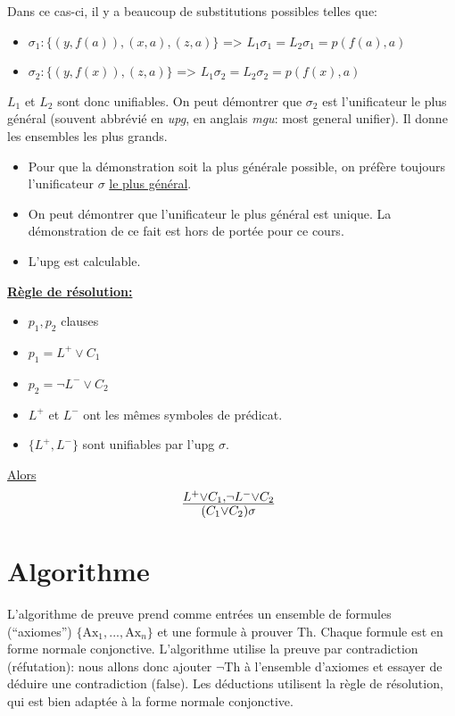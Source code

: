 {Dans ce cas-ci, il y a beaucoup de substitutions possibles telles que:
\begin{itemize}
  \item $\sigma_1 : \big\{ (y, f(a)), (x,a), (z,a) \big\}$ => $L_1 \sigma_1 = L_2 \sigma_1 = p(f(a), a)$
  \item $\sigma_2 : \big\{ (y, f(x)), (z,a) \big\}$ \hspace{11 mm}=> $L_1 \sigma_2 = L_2 \sigma_2 = p(f(x), a)$
\end{itemize}
$L_1$ et $L_2$ sont donc unifiables.
On peut démontrer que $\sigma_2$ est l'unificateur le plus général (souvent abbrévié en {\em upg},
en anglais {\em mgu}: most general unifier).
Il donne les ensembles les plus grands.\\

\begin{itemize}
  \item Pour que la démonstration soit la plus générale possible,
  on préfère toujours l'unificateur $\sigma$ \underline{le plus général}.
  \item On peut démontrer que l'unificateur le plus général est unique.
  La démonstration de ce fait est hors de portée pour ce cours.
  \item L'upg est calculable.
\end{itemize}

\vspace{5 mm}
\textbf{\underline{Règle de résolution:}}
\begin{itemize}
  \item $p_1, p_2$ clauses
  \item $p_1 = L^{+} \vee C_1$
  \item $p_2 = \neg L^{-} \vee C_2$
  \item $ L^{+}$ et $L^{-}$ ont les mêmes symboles de prédicat.
  \item $ \big\{L^{+}, L^{-}\big\}$ sont unifiables par l'upg $\sigma$.
\end{itemize}

\underline{Alors} $$ \mbox{\Large $\frac{L^{+} \vee C_1, \neg L^{-} \vee C_2}{(C_1 \vee C_2)\sigma}$ } $$

\section{Algorithme}

L'algorithme de preuve prend comme entrées un ensemble
de formules (``axiomes'') $\{ \mathrm{Ax}_1, ..., \mathrm{Ax}_n \}$
et une formule à prouver $\mathrm{Th}$.
Chaque formule est en forme normale conjonctive.
L'algorithme utilise la preuve par contradiction (réfutation):
nous allons donc ajouter $\neg \mathrm{Th}$ à l'ensemble d'axiomes
et essayer de déduire une contradiction ($\mathrm{false}$).
Les déductions utilisent la règle de résolution, qui est bien adaptée
à la forme normale conjonctive.

}
